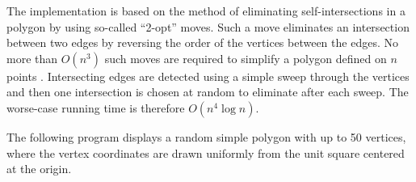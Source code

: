 \ccImplementation 
The implementation is based on the method of eliminating self-intersections in
a polygon by using so-called ``2-opt'' moves.  Such a move eliminates an 
intersection between two edges by reversing the order of the vertices between 
the edges.  No more than $O(n^3)$ such moves are required to simplify a polygon
defined on $n$ points \cite{ls-utstp-82}.
Intersecting edges are detected using a simple sweep through the vertices
and then one intersection is chosen at random to eliminate after each sweep. 
The worse-case running time is therefore $O(n^4 \log n)$.

\ccExample

The following program displays a random simple polygon with up to 50
vertices, where the vertex coordinates are drawn uniformly from the 
unit square centered at the origin.


